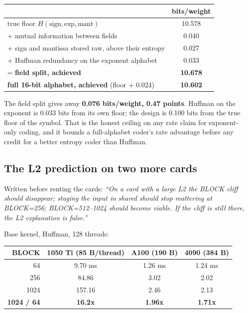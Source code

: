 \documentclass[11pt,a4paper]{article}
\newcommand{\B}[1]{\textbf{#1}}
\begin{document}
\begin{center}
\begin{tabular}{@{}lc@{}}
\toprule
 & bits/weight \\
\midrule
true floor $H(\text{sign},\text{exp},\text{mant})$ & 10.578 \\
+ mutual information between fields & 0.040 \\
+ sign and mantissa stored raw, above their entropy & 0.027 \\
+ Huffman redundancy on the exponent alphabet & 0.033 \\
= \B{field split, achieved} & \B{10.678} \\
\B{full 16-bit alphabet, achieved} (floor + 0.024) & \B{10.602} \\
\bottomrule
\end{tabular}
\end{center}

The field split gives away \B{0.076 bits/weight, 0.47 points}. Huffman on the exponent is 0.033 bits from its own floor; the design is 0.100 bits from the true floor of the symbol. That is the honest ceiling on any rate claim for exponent-only coding, and it bounds a full-alphabet coder's rate advantage before any credit for a better entropy coder than Huffman.

\subsection{The L2 prediction on two more cards}\label{sec:l2}

Written before renting the cards: \emph{``On a card with a large L2 the BLOCK cliff should disappear; staging the input in shared should stop mattering at BLOCK=256; BLOCK=512--1024 should become viable. If the cliff is still there, the L2 explanation is false.''}

Base kernel, Huffman, 128 threads:

\begin{center}
\begin{tabular}{@{}rccc@{}}
\toprule
BLOCK & 1050 Ti (85 B/thread) & A100 (190 B) & 4090 (384 B) \\
\midrule
64 & 9.70 ms & 1.26 ms & 1.24 ms \\
256 & 84.86 & 3.02 & 2.02 \\
1024 & 157.16 & 2.46 & 2.13 \\
\B{1024 / 64} & \B{16.2x} & \B{1.96x} & \B{1.71x} \\
\bottomrule
\end{tabular}
\end{center}
\end{document}
